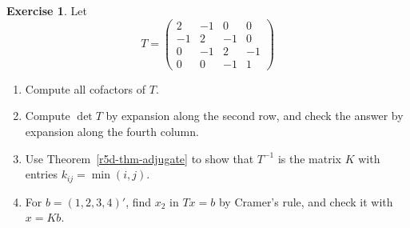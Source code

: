 \documentclass[12pt]{article}
\theoremstyle{definition}
\newtheorem{exercise}{Exercise}
\begin{document}
\begin{exercise}\label{r5d-ex-cofactors}
Let
\[
T=\begin{pmatrix}2&-1&0&0\\-1&2&-1&0\\0&-1&2&-1\\0&0&-1&1\end{pmatrix}
\]
\begin{enumerate}
\item Compute all cofactors of \(T\).
\item Compute \(\det T\) by expansion along the second row, and check the answer by expansion along the
fourth column.
\item Use Theorem~\ref{r5d-thm-adjugate} to show that \(T^{-1}\) is the matrix \(K\) with entries
\(k_{ij}=\min(i,j)\).
\item For \(b=(1,2,3,4)'\), find \(x_2\) in \(Tx=b\) by Cramer's rule, and check it with \(x=Kb\).
\end{enumerate}
\end{exercise}
\end{document}
